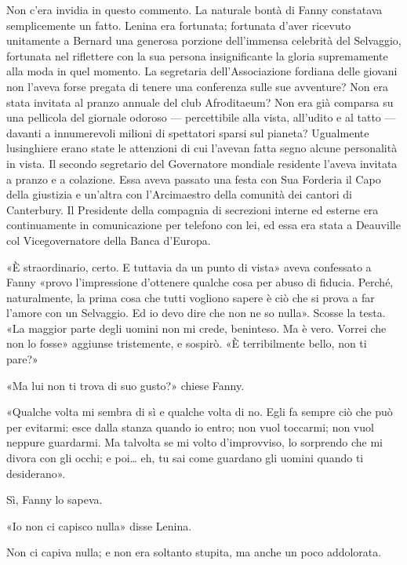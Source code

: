 \documentclass[
a5paper, %
10pt, %
twoside, 
onecolumn, %
openany, %
]{memoir}
\begin{document}
Non c’era invidia in questo commento. La naturale bontà di Fanny constatava semplicemente un fatto. Lenina era fortunata; fortunata d’aver ricevuto unitamente a Bernard una generosa porzione dell’immensa celebrità del Selvaggio, fortunata nel riflettere con la sua persona insignificante la gloria supremamente alla moda in quel momento. La segretaria dell’Associazione fordiana delle giovani non l’aveva forse pregata di tenere una conferenza sulle sue avventure? Non era stata invitata al pranzo annuale del club Afroditaeum? Non era già comparsa su una pellicola del giornale odoroso — percettibile alla vista, all’udito e al tatto — davanti a innumerevoli milioni di spettatori sparsi sul pianeta? Ugualmente lusinghiere erano state le attenzioni di cui l’avevan fatta segno alcune personalità in vista. Il secondo segretario del Governatore mondiale residente l’aveva invitata a pranzo e a colazione. Essa aveva passato una festa con Sua Forderia il Capo della giustizia e un’altra con l’Arcimaestro della comunità dei cantori di Canterbury. Il Presidente della compagnia di secrezioni interne ed esterne era continuamente in comunicazione per telefono con lei, ed essa era stata a Deauville col Vicegovernatore della Banca d’Europa.

«È straordinario, certo. E tuttavia da un punto di vista» aveva confessato a Fanny «provo l’impressione d’ottenere qualche cosa per abuso di fiducia. Perché, naturalmente, la prima cosa che tutti vogliono sapere è ciò che si prova a far l’amore con un Selvaggio. Ed io devo dire che non ne so nulla». Scosse la testa. «La maggior parte degli uomini non mi crede, beninteso. Ma è vero. Vorrei che non lo fosse» aggiunse tristemente, e sospirò. «È terribilmente bello, non ti pare?»

«Ma lui non ti trova di suo gusto?» chiese Fanny.

«Qualche volta mi sembra di sì e qualche volta di no. Egli fa sempre ciò che può per evitarmi: esce dalla stanza quando io entro; non vuol toccarmi; non vuol neppure guardarmi. Ma talvolta se mi volto d’improvviso, lo sorprendo che mi divora con gli occhi; e poi… eh, tu sai come guardano gli uomini quando ti desiderano».

Sì, Fanny lo sapeva.

«Io non ci capisco nulla» disse Lenina.

Non ci capiva nulla; e non era soltanto stupita, ma anche un poco addolorata.
\end{document}
